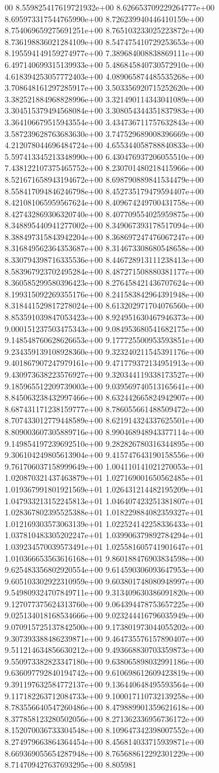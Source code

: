 00	8.559825417619721932e+00	8.626653709229264777e+00	8.695973317544765990e+00	8.726239940446410159e+00	8.754069659275691251e+00	8.765103233025223872e+00	8.736198836021284109e+00	8.547475410729253653e+00	8.195594149159274977e+00	7.389684008838869111e+00	6.497140699315139933e+00	5.486845840730572910e+00	4.618394253057772403e+00	4.089065874485535268e+00	3.708648161297285917e+00	3.503356920715252620e+00	3.382521884968828996e+00	3.321490114343041089e+00	3.304515379494568084e+00	3.308054344351837983e+00	3.364106679515943554e+00	3.434736711757632843e+00	3.587239628763683630e+00	3.747529689008396669e+00	4.212078044696484724e+00	4.655344058788840833e+00	5.597413345213348990e+00	6.430476937206055510e+00	7.438122107375465752e+00	8.230701480218415966e+00	8.521671658943194672e+00	8.698790889841534479e+00	8.558417094846246798e+00	8.452735179479594407e+00	8.421081065959567624e+00	8.409674249700431758e+00	8.427432869306320740e+00	8.407709554025959875e+00	8.348895440941277002e+00	8.349067393178517094e+00	8.388497315843942204e+00	8.368697247476067247e+00	8.316849562364353687e+00	8.314673308680548658e+00	8.330794398716335536e+00	8.446728913111238413e+00	8.583967923702495284e+00	8.487271508880381177e+00	8.360585299580396423e+00	8.276458421436707624e+00	8.199315092269355176e+00	8.241583842964391948e+00	8.318441529817278024e+00	8.613202971704076560e+00	8.853591039847053423e+00	8.924951630467946373e+00	9.000151237503475343e+00	9.084953680541682175e+00	9.148548760628626653e+00	9.177725500953593851e+00	9.234359139108928360e+00	9.323240211545391176e+00	9.401867907247979161e+00	9.471779372134951913e+00	9.430973638223576927e+00	9.320344119338173527e+00	9.185965512209739003e+00	9.039569740513165641e+00	8.845063238432997466e+00	8.632442665824942907e+00	8.687431171238159777e+00	8.786055661488509472e+00	8.707433012779448589e+00	8.621914324337625501e+00	8.809003607305889716e+00	8.990468948943377114e+00	9.149854197239692510e+00	9.282826780316344895e+00	9.306104249805613904e+00	9.415747643190158556e+00	9.761706037158999649e+00	1.004110141021270053e+01	1.020870321437463879e+01	1.027169001650562485e+01	1.019367991801921569e+01	1.026431214482195209e+01	1.047933213152245813e+01	1.046407423251381807e+01	1.028367802395525388e+01	1.018229884082359327e+01	1.012169303573063139e+01	1.022524142258336433e+01	1.037810483305202247e+01	1.039906379892784294e+01	1.039234570039573491e+01	1.025581605741901647e+01	1.010366653563616168e+01	9.860188476903834598e+00	9.625483356802920554e+00	9.614590306093647953e+00	9.605103302922310959e+00	9.603801748080948997e+00	9.549809324707849711e+00	9.313409630386091820e+00	9.127077375624313760e+00	9.064394478753657225e+00	9.025134018168534666e+00	9.023244416796035949e+00	9.070915725137842500e+00	9.173801973044055202e+00	9.307393388486239871e+00	9.464735576157890407e+00	9.511214634856630212e+00	9.493668830703359873e+00	9.550973382823347180e+00	9.638065898032991186e+00	9.636097792840194742e+00	9.610698612609423819e+00	9.391197632584772137e+00	9.136440648495593564e+00	9.117182263712084733e+00	9.100017110732139258e+00	8.783556640547260486e+00	8.479889901359621618e+00	8.377858123280502056e+00	8.271362336956736172e+00	8.152070036733304548e+00	8.109647342398007552e+00	8.274979663864364454e+00	8.456814033715939871e+00	8.669369055654287948e+00	8.765688612292301229e+00	8.714709427637693295e+00	8.805981